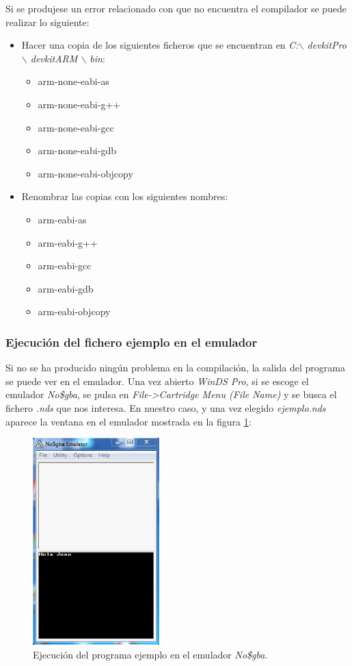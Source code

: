 Si se produjese un error relacionado con que no encuentra el compilador se puede realizar lo siguiente:
\begin{itemize}
\item Hacer una copia de los siguientes ficheros que se encuentran en \textit{C:$\backslash$ devkitPro $\backslash$ devkitARM $\backslash$ bin}:	
	\begin{itemize}
 		\item arm-none-eabi-as
 		\item arm-none-eabi-g++
	 	\item arm-none-eabi-gcc	
 		\item arm-none-eabi-gdb
	   \item arm-none-eabi-objcopy
	\end{itemize}
\item Renombrar las copias con los siguientes nombres:	
	\begin{itemize}
		\item arm-eabi-as
	 	\item arm-eabi-g++
	 	\item arm-eabi-gcc	
 		\item arm-eabi-gdb
	   \item arm-eabi-objcopy
	\end{itemize}
\end{itemize}

\subsubsection{Ejecución del fichero ejemplo en el emulador}
Si no se ha producido ningún problema en la compilación, la salida del programa se puede ver en el emulador. Una vez abierto \textit{WinDS Pro}, si se escoge el emulador \textit{No\$gba}, se pulsa en \textit{File->Cartridge Menu (File Name)} y se busca el fichero \textit{.nds} que nos interesa. En nuestro caso, y una vez elegido \textit{ejemplo.nds} aparece la ventana en el emulador mostrada en la figura \ref{fig_c2_eclipse11b}:

\begin{figure}[h]
\centering
\includegraphics[height=8cm]{./Figuras/C2/c2_eclipse11b.png}
\caption{Ejecución del programa ejemplo en el emulador \textit{No\$gba}.}
\label{fig_c2_eclipse11b}
\end{figure}

